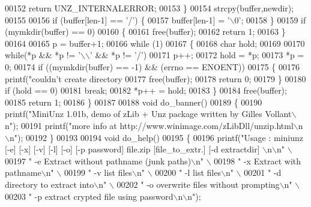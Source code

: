 \begin{DoxyCode}
{00152                 \textcolor{keywordflow}{return} UNZ\_INTERNALERROR;
00153         \}
00154   strcpy(buffer,newdir);
00155 
00156   \textcolor{keywordflow}{if} (buffer[len-1] == \textcolor{charliteral}{'/'}) \{
00157     buffer[len-1] = \textcolor{charliteral}{'\(\backslash\)0'};
00158   \}
00159   \textcolor{keywordflow}{if} (mymkdir(buffer) == 0)
00160     \{
00161       free(buffer);
00162       \textcolor{keywordflow}{return} 1;
00163     \}
00164 
00165   p = buffer+1;
00166   \textcolor{keywordflow}{while} (1)
00167     \{
00168       \textcolor{keywordtype}{char} hold;
00169 
00170       \textcolor{keywordflow}{while}(*p && *p != \textcolor{charliteral}{'\(\backslash\)\(\backslash\)'} && *p != \textcolor{charliteral}{'/'})
00171         p++;
00172       hold = *p;
00173       *p = 0;
00174       \textcolor{keywordflow}{if} ((mymkdir(buffer) == -1) && (errno == ENOENT))
00175         \{
00176           printf(\textcolor{stringliteral}{"couldn't create directory %
00177           free(buffer);
00178           \textcolor{keywordflow}{return} 0;
00179         \}
00180       \textcolor{keywordflow}{if} (hold == 0)
00181         \textcolor{keywordflow}{break};
00182       *p++ = hold;
00183     \}
00184   free(buffer);
00185   \textcolor{keywordflow}{return} 1;
00186 \}
00187 
00188 \textcolor{keywordtype}{void} do\_banner()
00189 \{
00190     printf(\textcolor{stringliteral}{"MiniUnz 1.01b, demo of zLib + Unz package written by Gilles Vollant\(\backslash\)n"});
00191     printf(\textcolor{stringliteral}{"more info at http://www.winimage.com/zLibDll/unzip.html\(\backslash\)n\(\backslash\)n"});
00192 \}
00193 
00194 \textcolor{keywordtype}{void} do\_help()
00195 \{
00196     printf(\textcolor{stringliteral}{"Usage : miniunz [-e] [-x] [-v] [-l] [-o] [-p password] file.zip [file\_to\_extr.] [-d extractdir]
      \(\backslash\)n\(\backslash\)n"} \(\backslash\)
00197            \textcolor{stringliteral}{"  -e  Extract without pathname (junk paths)\(\backslash\)n"} \(\backslash\)
00198            \textcolor{stringliteral}{"  -x  Extract with pathname\(\backslash\)n"} \(\backslash\)
00199            \textcolor{stringliteral}{"  -v  list files\(\backslash\)n"} \(\backslash\)
00200            \textcolor{stringliteral}{"  -l  list files\(\backslash\)n"} \(\backslash\)
00201            \textcolor{stringliteral}{"  -d  directory to extract into\(\backslash\)n"} \(\backslash\)
00202            \textcolor{stringliteral}{"  -o  overwrite files without prompting\(\backslash\)n"} \(\backslash\)
00203            \textcolor{stringliteral}{"  -p  extract crypted file using password\(\backslash\)n\(\backslash\)n"});
}}
\end{DoxyCode}
